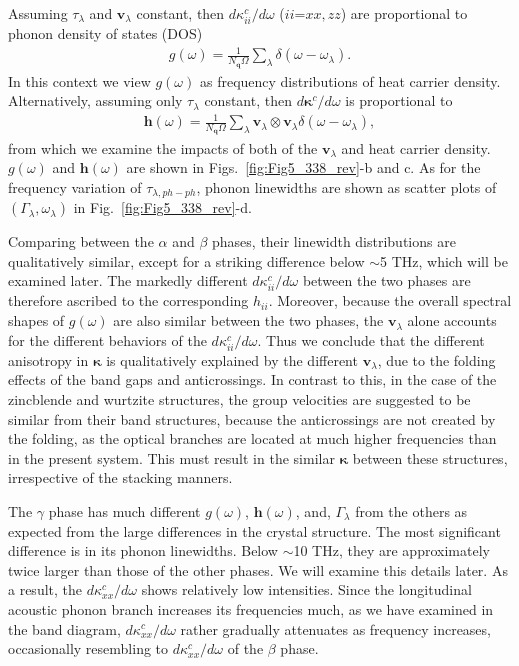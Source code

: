 \documentclass[twocolumn,amsmath,amssymb,a4paper,prb,superscriptaddress,floatfix]{revtex4-1}
\begin{document}
Assuming $\tau_\lambda$ and $\mathbf{v}_\lambda$ constant, then
$d\kappa_{ii}^c/d\omega$ ($ii$=$xx,zz$) are proportional to phonon density of
states (DOS)  
\begin{align}
 \label{eq:dos}
 g(\omega) = \frac{1}{N_\mathbf{q}\Omega}
 \sum_\lambda
 \delta(\omega-\omega_{\lambda}).
\end{align}
In this context we view $g(\omega)$ as frequency distributions of heat
carrier density.  Alternatively, assuming only $\tau_\lambda$ constant,
then $d\boldsymbol{\kappa}^c/d\omega$ is proportional to
\begin{align}
 \label{eq:wdos}
 \boldsymbol{h}(\omega) = \frac{1}{N_\mathbf{q}\Omega}
 \sum_\lambda
 \mathbf{v}_\lambda \otimes \mathbf{v}_\lambda
 \delta(\omega-\omega_{\lambda}),
\end{align}
from which we examine the impacts of both of the $\mathbf{v}_\lambda$ and heat carrier
density.  $g(\omega)$ and  $\boldsymbol{h}(\omega)$
are shown in
Figs.~\ref{fig:Fig5_338_rev}-b and c.  As for the frequency
variation of $\tau_{\lambda,ph-ph}$, phonon linewidths are shown as scatter
plots of $(\Gamma_\lambda,\omega_\lambda)$ in Fig.~\ref{fig:Fig5_338_rev}-d.

Comparing between the $\alpha$ and $\beta$ phases,  their linewidth
distributions are qualitatively similar, except for a striking difference below
$\sim$5 THz, which will be examined later. The markedly different
$d\kappa_{ii}^c/d\omega$ between the two phases are therefore ascribed to the
corresponding $h_{ii}$. Moreover, because the overall spectral shapes of
$g(\omega)$ are also similar between the two phases, the $\mathbf{v}_\lambda$
alone accounts for the different behaviors of the $d\kappa_{ii}^c/d\omega$. Thus
we conclude that the different anisotropy in $\boldsymbol{\kappa}$ is
qualitatively explained by the different $\mathbf{v}_\lambda$, due to the
folding effects of the band gaps and anticrossings. In contrast to this, in the
case of the zincblende and wurtzite structures, the group velocities are
suggested to be similar from their band structures\cite{phono3py}, because the
anticrossings are not created by the folding, as the optical branches are
located at much higher frequencies than in the present system. This
must result in the similar $\boldsymbol{\kappa}$ between these structures,
irrespective of the stacking manners. 

The $\gamma$ phase has much different  $g(\omega)$, $\boldsymbol{h}(\omega)$,
and, $\Gamma_\lambda$ from the others as expected from the large differences in
the crystal structure. The most significant difference is in its phonon
linewidths. Below $\sim$10 THz, they are approximately twice larger than those
of the other phases. We will examine this details later.  As a result, the
$d\kappa_{xx}^c/d\omega$ shows relatively low intensities.  Since the
longitudinal acoustic phonon branch increases its frequencies much, as we have
examined in the band diagram, $d\kappa_{xx}^c/d\omega$ rather gradually
attenuates as frequency increases, occasionally resembling to
$d\kappa_{xx}^c/d\omega$ of the $\beta$ phase.
\end{document}
